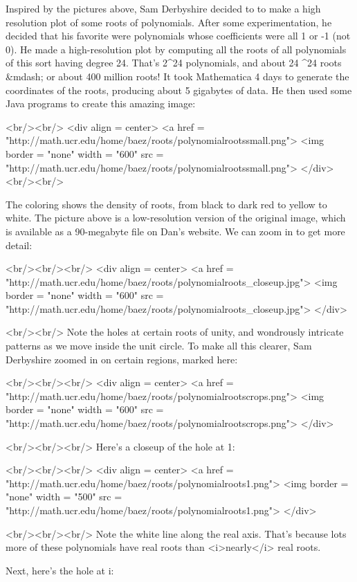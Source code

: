 Inspired by the pictures above, Sam Derbyshire decided to to make a
high resolution plot of some roots of polynomials.  After some
experimentation, he decided that his favorite were polynomials whose
coefficients were all 1 or -1 (not 0).  He made a high-resolution plot
by computing all the roots of all polynomials of this sort having
degree 24.  That's 2^{24} polynomials, and about 24 ^{24} roots &mdash; or about 400 million roots!  It took
Mathematica 4 days to generate the coordinates of the roots, producing
about 5 gigabytes of data.  He then used some Java programs to create
this amazing image:  

<br/><br/>
<div align = center>
<a href = "http://math.ucr.edu/home/baez/roots/polynomialrootssmall.png">
<img border = "none" width = "600" src = "http://math.ucr.edu/home/baez/roots/polynomialrootssmall.png">
</div>
<br/><br/>

The coloring shows the density of roots, from black to dark red to
yellow to white.  The picture above is a low-resolution version of the
original image, which is available as a 90-megabyte file on Dan's
website.  We can zoom in to get more detail:

<br/><br/><br/>
<div align = center>
<a href = "http://math.ucr.edu/home/baez/roots/polynomialroots_closeup.jpg">
<img border = "none" width = "600" src = "http://math.ucr.edu/home/baez/roots/polynomialroots_closeup.jpg">
</div>

<br/><br/>
Note the holes at certain roots of unity, and wondrously intricate
patterns as we move inside the unit circle.  To make all this clearer,
Sam Derbyshire zoomed in on certain regions, marked here:

<br/><br/><br/>
<div align = center>
<a href = "http://math.ucr.edu/home/baez/roots/polynomialrootscrops.png">
<img border = "none" width = "600" src = "http://math.ucr.edu/home/baez/roots/polynomialrootscrops.png">
</div>

<br/><br/><br/>
Here's a closeup of the hole at 1:  

<br/><br/><br/>
<div align = center>
<a href = "http://math.ucr.edu/home/baez/roots/polynomialroots1.png">
<img border = "none" width = "500" src = "http://math.ucr.edu/home/baez/roots/polynomialroots1.png">
</div>

<br/><br/><br/>
Note the white line along the real axis.  That's because lots more of
these polynomials have real roots than <i>nearly</i> real roots.

Next, here's the hole at i:

